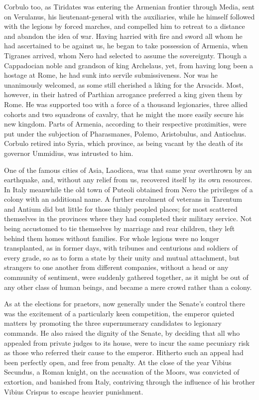 Corbulo too, as Tiridates was entering the Armenian frontier through Media, sent on Verulanus, his lieutenant-general with the auxiliaries, while he himself followed with the legions by forced marches, and compelled him to retreat to a distance and abandon the idea of war. Having harried with fire and sword all whom he had ascertained to be against us, he began to take possession of Armenia, when Tigranes arrived, whom Nero had selected to assume the sovereignty. Though a Cappadocian noble and grandson of king Archelaus, yet, from having long been a hostage at Rome, he had sunk into servile submissiveness. Nor was he unanimously welcomed, as some still cherished a liking for the Arsacids. Most, however, in their hatred of Parthian arrogance preferred a king given them by Rome. He was supported too with a force of a thousand legionaries, three allied cohorts and two squadrons of cavalry, that he might the more easily secure his new kingdom. Parts of Armenia, according to their respective proximities, were put under the subjection of Pharasmanes, Polemo, Aristobulus, and Antiochus. Corbulo retired into Syria, which province, as being vacant by the death of its governor Ummidius, was intrusted to him.


One of the famous cities of Asia, Laodicea, was that same year overthrown by an earthquake, and, without any relief from us, recovered itself by its own resources. In Italy meanwhile the old town of Puteoli obtained from Nero the privileges of a colony with an additional name. A further enrolment of veterans in Tarentum and Antium did but little for those thinly peopled places; for most scattered themselves in the provinces where they had completed their military service. Not being accustomed to tie themselves by marriage and rear children, they left behind them homes without families. For whole legions were no longer transplanted, as in former days, with tribunes and centurions and soldiers of every grade, so as to form a state by their unity and mutual attachment, but strangers to one another from different companies, without a head or any community of sentiment, were suddenly gathered together, as it might be out of any other class of human beings, and became a mere crowd rather than a colony.


As at the elections for praetors, now generally under the Senate's control there was the excitement of a particularly keen competition, the emperor quieted matters by promoting the three supernumerary candidates to legionary commands. He also raised the dignity of the Senate, by deciding that all who appealed from private judges to its house, were to incur the same pecuniary risk as those who referred their cause to the emperor. Hitherto such an appeal had been perfectly open, and free from penalty. At the close of the year Vibius Secundus, a Roman knight, on the accusation of the Moors, was convicted of extortion, and banished from Italy, contriving through the influence of his brother Vibius Crispus to escape heavier punishment.

